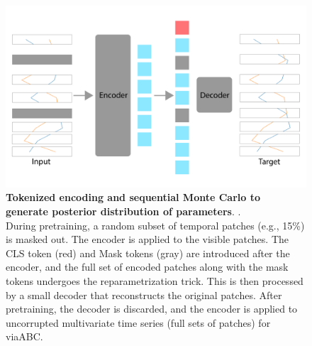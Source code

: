 \documentclass[12pt]{article} %
\newcommand{\blue}[1]{{\color{magenta}{#1}}}
\begin{document}
\begin{figure}
    \centering
    \includegraphics[width=0.75\linewidth]{figures/model_architecture.png}
    \caption{\textbf{Tokenized encoding and sequential Monte Carlo to generate posterior distribution of parameters}.
\blue{this figure will be the full schematic of VIA-ABC}. \\    
During pretraining, a random subset of temporal patches (e.g., 15\%) is masked out. The encoder is applied to the visible patches. The CLS token (red) and Mask tokens (gray) are introduced after the encoder, and the full set of encoded patches along with the mask tokens undergoes the reparametrization trick. This is then processed by a small decoder that reconstructs the original patches. After pretraining, the decoder is discarded, and the encoder is applied to uncorrupted multivariate time series (full sets of patches) for viaABC.}
    \label{fig:enter-label}
\end{figure}


%
%
%
%
\end{document}

